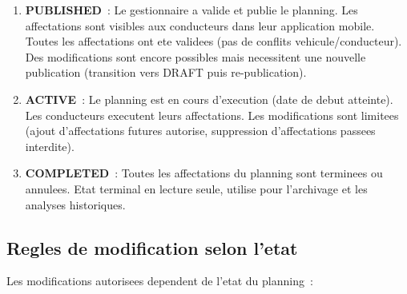 \documentclass[12pt,a4paper]{report}
\begin{document}
\begin{enumerate}[leftmargin=2cm]
\begin{enumerate}[leftmargin=2cm]
  \item \textbf{PUBLISHED}~: Le gestionnaire a valide et publie le planning.
        Les affectations sont visibles aux conducteurs dans leur application
        mobile. Toutes les affectations ont ete validees (pas de conflits
        vehicule/conducteur). Des modifications sont encore possibles mais
        necessitent une nouvelle publication (transition vers DRAFT puis
        re-publication).
        
  \item \textbf{ACTIVE}~: Le planning est en cours d'execution (date de debut
        atteinte). Les conducteurs executent leurs affectations. Les modifications
        sont limitees (ajout d'affectations futures autorise, suppression
        d'affectations passees interdite).
        
  \item \textbf{COMPLETED}~: Toutes les affectations du planning sont
        terminees ou annulees. Etat terminal en lecture seule, utilise
        pour l'archivage et les analyses historiques.
\end{enumerate}

\subsection{Regles de modification selon l'etat}

Les modifications autorisees dependent de l'etat du planning~:


\end{enumerate}
\end{document}
